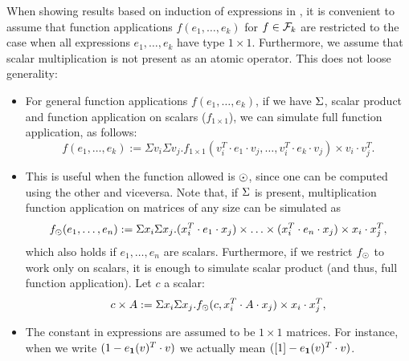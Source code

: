 When showing results based on induction of expressions in \langfor, it is convenient to assume that function applications $f(e_1,\ldots,e_k)$ for $f\in\mathcal{F}_k$ are restricted to
the case when all expressions $e_1,\ldots,e_k$ have type $1\times 1$. Furthermore, we assume that scalar multiplication is not present as an atomic operator. This does not loose generality:
%
%

\begin{itemize}
\item 
For general function applications $f(e_1,\ldots,e_k)$, if we have $\Sigma$, scalar product and function application on scalars ($f_{1\times 1}$), we can simulate full function application, as follows:
 $$
f(e_1,\ldots, e_k) :=\Sigma v_i \Sigma v_j. f_{1\times 1}(v_i^T\cdot e_1\cdot v_j, \ldots ,v_i^T\cdot e_k\cdot v_j) \times v_i\cdot v_j^T.
$$

\item  This is useful when the function allowed is $\odot$, since one can be computed using the other and viceversa.
Note that, if $\Sigma$ is present, multiplication function application on matrices of any size can be simulated as 
$$
f_{\odot}(e_1,\ldots, e_n) :=\Sigma x_i \Sigma x_j. (x_i^T\cdot e_1\cdot x_j)\times \ldots \times (x_i^T\cdot e_n\cdot x_j) \times x_i\cdot x_j^T,
$$
which also holds if $e_1,\ldots, e_n$ are scalars. Furthermore, if we restrict $f_{\odot}$ to
work only on scalars, it is enough to simulate scalar product (and thus, full function application). Let $c$ a scalar:
$$
c\times A :=\Sigma x_i \Sigma x_j. f_{\odot}(c, x_i^T\cdot A\cdot x_j) \times x_i\cdot x_j^T,
$$




\item The constant in expressions are assumed to be $1\times 1$ matrices. 
For instance, when we write $(1-e_{\mathbf{1}}(v)^T\cdot v)$ we actually mean $([1]-e_{\mathbf{1}}(v)^T\cdot v)$.


\end{itemize}